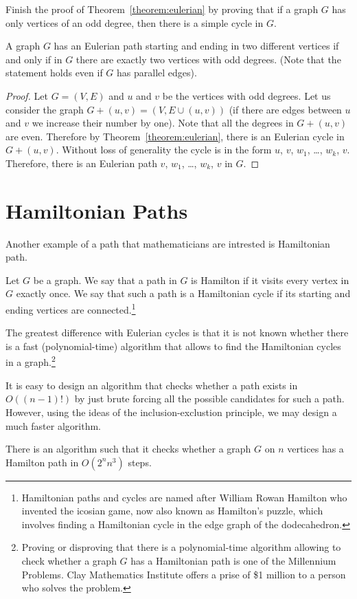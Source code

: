 \begin{exercise}
  Finish the proof of Theorem~\ref{theorem:eulerian} by proving that if a graph
  $G$ has only vertices of an odd degree, then there is a simple cycle in $G$.
\end{exercise}

\begin{corollary}
  A graph $G$ has an Eulerian path starting and ending in two different
  vertices if and only if in $G$ there are exactly two vertices with odd
  degrees.
  (Note that the statement holds even if $G$ has parallel edges).
\end{corollary}
\begin{proof}
  Let $G = (V, E)$ and $u$ and $v$ be the vertices with odd degrees. Let us
  consider the graph $G + (u, v) = (V, E \cup (u, v))$ (if there are edges
  between $u$ and $v$ we increase their number by one). Note that all
  the degrees in $G + (u, v)$ are even.
  Therefore by Theorem~\ref{theorem:eulerian}, there is an Eulerian cycle in
  $G + (u, v)$. Without loss of generality the cycle is in the form $u$, $v$,
  $w_1$, \dots, $w_k$, $v$. Therefore, there is an Eulerian path $v$,
  $w_1$, \dots, $w_k$, $v$ in $G$.
\end{proof}

\section{Hamiltonian Paths}

Another example of a path that mathematicians are intrested is Hamiltonian path.
\begin{definition}
  Let $G$ be a graph. We say that a path in $G$ is Hamilton
  if it visits every vertex in $G$ exactly once. We say that such a path is a
  Hamiltonian cycle if its starting and ending vertices are
  connected.\footnote{%
    Hamiltonian paths and cycles are named after William Rowan Hamilton who
    invented the icosian game, now also known as Hamilton's puzzle, which
    involves finding a Hamiltonian cycle in the edge graph of the dodecahedron.
  }
\end{definition}

The greatest difference with Eulerian cycles is that it is not known whether
there is a fast (polynomial-time) algorithm that allows to find the Hamiltonian
cycles in a graph.\footnote{%
  Proving or disproving that there is a polynomial-time algorithm allowing to
  check whether a graph $G$ has a Hamiltonian path is one of the Millennium
  Problems. Clay Mathematics Institute offers a prise of \$1 million to a person
  who solves the problem.
}

It is easy to design an algorithm that checks whether a path exists in
$O((n - 1)!)$ by just brute forcing all the possible candidates for such a path.
However, using the ideas of the inclusion-exclustion principle, we may design
a much faster algorithm.
\begin{theorem}
  There is an algorithm such that it checks whether a graph $G$ on $n$ vertices
  has a Hamilton path in $O(2^n n^3)$ steps.
\end{theorem}
